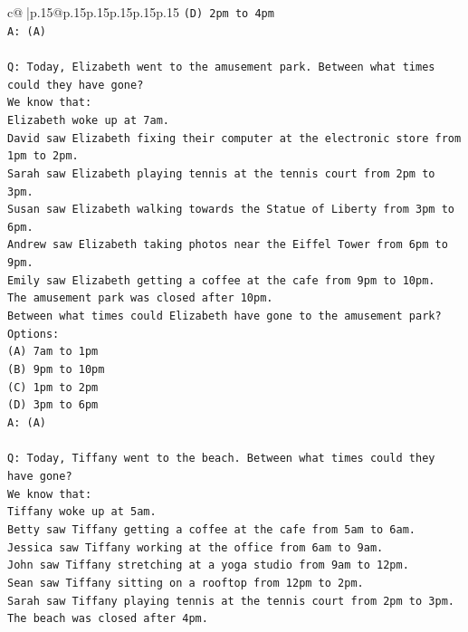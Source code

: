 \documentclass{article}
\begin{document}
{\begin{supertabular}{c@{$\;$}|p{.15\linewidth}@{}p{.15\linewidth}p{.15\linewidth}p{.15\linewidth}p{.15\linewidth}p{.15\linewidth}}
{{{\texttt{(D) 2pm to 4pm} \\
\texttt{A: (A)} \\
\\ 
\texttt{Q: Today, Elizabeth went to the amusement park. Between what times could they have gone?} \\
\texttt{We know that:} \\
\texttt{Elizabeth woke up at 7am.} \\
\texttt{David saw Elizabeth fixing their computer at the electronic store from 1pm to 2pm.} \\
\texttt{Sarah saw Elizabeth playing tennis at the tennis court from 2pm to 3pm.} \\
\texttt{Susan saw Elizabeth walking towards the Statue of Liberty from 3pm to 6pm.} \\
\texttt{Andrew saw Elizabeth taking photos near the Eiffel Tower from 6pm to 9pm.} \\
\texttt{Emily saw Elizabeth getting a coffee at the cafe from 9pm to 10pm.} \\
\texttt{The amusement park was closed after 10pm.} \\
\texttt{Between what times could Elizabeth have gone to the amusement park?} \\
\texttt{Options:} \\
\texttt{(A) 7am to 1pm} \\
\texttt{(B) 9pm to 10pm} \\
\texttt{(C) 1pm to 2pm} \\
\texttt{(D) 3pm to 6pm} \\
\texttt{A: (A)} \\
\\ 
\texttt{Q: Today, Tiffany went to the beach. Between what times could they have gone?} \\
\texttt{We know that:} \\
\texttt{Tiffany woke up at 5am.} \\
\texttt{Betty saw Tiffany getting a coffee at the cafe from 5am to 6am.} \\
\texttt{Jessica saw Tiffany working at the office from 6am to 9am.} \\
\texttt{John saw Tiffany stretching at a yoga studio from 9am to 12pm.} \\
\texttt{Sean saw Tiffany sitting on a rooftop from 12pm to 2pm.} \\
\texttt{Sarah saw Tiffany playing tennis at the tennis court from 2pm to 3pm.} \\
\texttt{The beach was closed after 4pm.} \\
}}}
\end{supertabular}}
\end{document}
